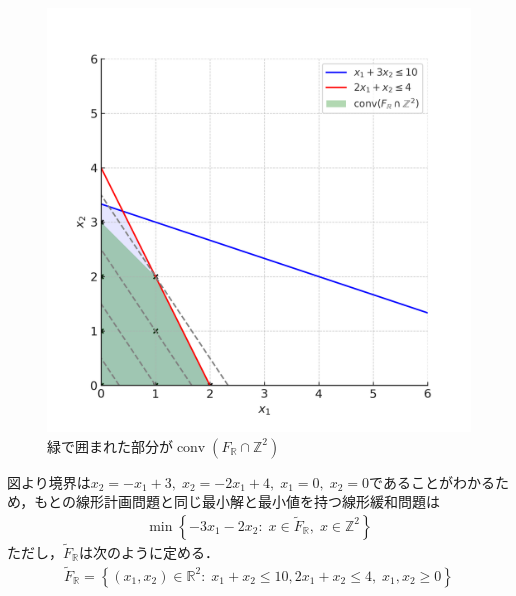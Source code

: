 \documentclass[a4j,uplatex]{jsarticle}
\theoremstyle{definition}
\DeclareMathOperator{\conv}{conv}
\begin{document}
\begin{figure}[h]
    \centering
    \includegraphics[width=0.6\linewidth]{lp_region_with_convex_filled.png}
    \caption{緑で囲まれた部分が$\conv(F_\mathbb{R}\cap\mathbb{Z}^2)$}
\end{figure}
図より境界は$x_2=-x_1+3,\; x_2=-2x_1+4,\; x_1=0,\; x_2=0$であることがわかるため，もとの線形計画問題と同じ最小解と最小値を持つ線形緩和問題は
\begin{align*}
    \min \left\{-3x_1-2x_2:\; x\in\tilde{F}_\mathbb{R},\; x\in\mathbb{Z}^2\right\}
\end{align*}
ただし，$\tilde{F}_\mathbb{R}$は次のように定める．
\begin{align*}
    \tilde{F}_\mathbb{R}=\left\{(x_1,x_2)\in\mathbb{R}^2:\; x_1+x_2\leq10,2x_1+x_2\leq4,\; x_1,x_2\geq0\right\}
\end{align*}
\end{document}
